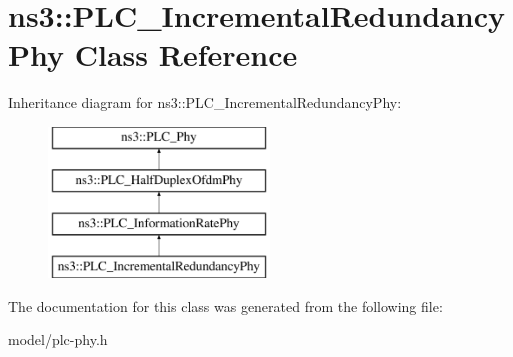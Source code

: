 \hypertarget{classns3_1_1PLC__IncrementalRedundancyPhy}{\section{ns3\-:\-:\-P\-L\-C\-\_\-\-Incremental\-Redundancy\-Phy \-Class \-Reference}
\label{classns3_1_1PLC__IncrementalRedundancyPhy}
}
\-Inheritance diagram for ns3\-:\-:\-P\-L\-C\-\_\-\-Incremental\-Redundancy\-Phy\-:\begin{figure}[H]
\begin{center}
\leavevmode
\includegraphics[height=4.000000cm]{classns3_1_1PLC__IncrementalRedundancyPhy}
\end{center}
\end{figure}


\-The documentation for this class was generated from the following file\-:\begin{DoxyCompactItemize}
\item 
model/plc-\/phy.\-h\end{DoxyCompactItemize}
